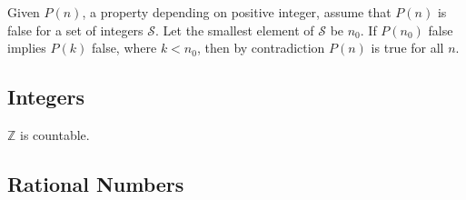 \documentclass{article}
\begin{document}
    \begin{theorem}
      Given $P(n)$, a property depending on positive integer, assume that $P(n)$ is false for a set of integers $\mathcal{S}$. Let the smallest element of $\mathcal{S}$ be $n_0$. If $P(n_0)$ false implies $P(k)$ false, where $k < n_0$, then by contradiction $P(n)$ is true for all $n$. 
    \end{theorem}

  \subsection{Integers} 

    \begin{theorem}[Countability]
      $\mathbb{Z}$ is countable. 
    \end{theorem}

  \subsection{Rational Numbers} 
\end{document}
